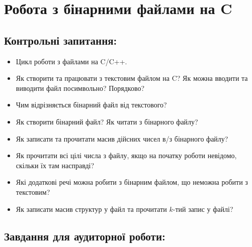 \documentclass[a5paper,titlepage,openany,twoside,
]
{book_unv}%
\begin{document}
\chapter{Робота з бінарними файлами на C}
%

\section{Контрольні запитання:}
\begin{itemize}
\item
  Цикл роботи з файлами на C/C++.
\item
  Як створити та працювати з текстовим файлом на C? Як можна вводити та
  виводити файл посимвольно? Порядково?
\item
  Чим відрізняється бінарний файл від текстового? 
\item 
  Як створити бінарний файл? Як читати з бінарного файлу?
\item
  Як записати та прочитати масив дійсних чисел в/з бінарного файлу?
\item
  Як прочитати всі цілі числа з файлу, якщо на початку роботи невідомо,
  скільки їх там насправді?
\item
  Які додаткові речі можна робити з бінарним файлом, що неможна робити з
  текстовим?
\item
  Як записати масив структур у файл та прочитати $k$-тий запис у файлі?
\end{itemize}

\section{Завдання для аудиторної роботи:}
\end{document}
